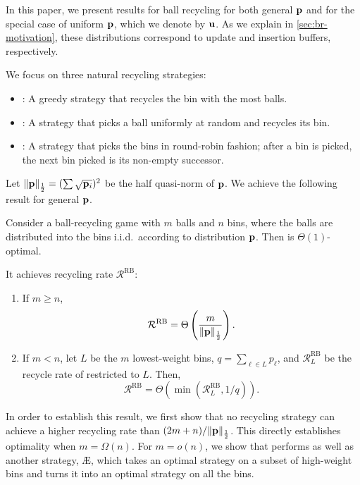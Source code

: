In this paper, we present results for ball recycling for both general $\mathbf{p}$ and
for the special case of uniform $\mathbf{p}$, which we denote by $\mathbf{u}$.  As we explain
in \cref{sec:br-motivation}, these distributions correspond to update and
insertion buffers, respectively.

We focus on three natural recycling strategies:
\begin{itemize}
\item \FB: A greedy strategy that recycles the bin with the most balls.
\item \RB: A strategy that picks a ball uniformly at random and recycles its
	bin.
\item \GG: A strategy that picks the bins in round-robin fashion; after a bin
	is picked, the next bin picked is its non-empty successor.
\end{itemize}
Let $\|\mathbf{p}\|_{\frac{1}{2}} = (\sum \sqrt{\mathbf{p}_i})^2$  be the half quasi-norm of $\mathbf{p}$.  We
achieve the following result for general $\mathbf{p}$.

\begin{theorem}\label{thm:random-opt}
	Consider a ball-recycling game with $m$ balls and $n$ bins, where the balls
	are distributed into the bins i.i.d.\ according to distribution $\mathbf{p}$. Then
	\RB{} is $\Theta(1)$-optimal.

        It achieves recycling rate
	$\mathcal{R}^\textrm{RB}$:
	\begin{enumerate}
		\item If $m \geq n$,
			\[\mathcal{R}^\textrm{RB} = \Theta\left(\frac{m}{\|\mathbf{p}\|_{\frac{1}{2}}}\right).\]
		\item If $m < n$, let $L$ be the $m$ lowest-weight bins, $q = \sum_{\ell\in
			L} p_\ell$, and $\mathcal{R}_L^\textrm{RB}$ be the recycle rate of
			\RB restricted to $L$. Then,
			\[\mathcal{R}^\textrm{RB} =
			\Theta\left(\min\left(\mathcal{R}_L^\textrm{RB}, 1/q\right)\right).\]
	\end{enumerate}
\end{theorem}

In order to establish this result, we first show that no recycling strategy can
achieve a higher recycling rate than $(2m+n)/\|\mathbf{p}\|_{\frac{1}{2}}$.  This directly
establishes optimality when $m = \Omega(n)$. For $m=o(n)$, we show that \RB
performs as well as another strategy, \AE, which takes an optimal strategy on a
subset of high-weight bins and turns it into an optimal strategy on all the
bins.

